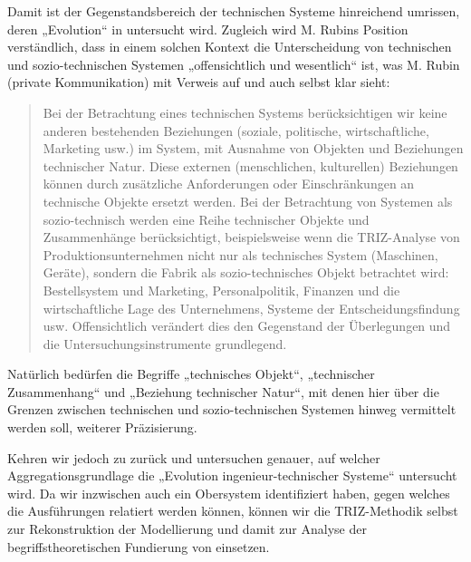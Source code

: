 \documentclass[11pt,a4paper]{article}
\begin{document}
Damit ist der Gegenstandsbereich der technischen Systeme hinreichend umrissen,
deren „Evolution“ in \cite{TESE2018} untersucht wird. Zugleich wird M. Rubins
Position verständlich, dass in einem solchen Kontext die Unterscheidung von
technischen und sozio-technischen Systemen „offensichtlich und wesentlich“
ist, was M. Rubin (private Kommunikation) mit Verweis auf \cite{Rubin2007} und
\cite{Rubin2010} auch selbst klar sieht:
\begin{quote}
  Bei der Betrachtung eines technischen Systems berücksichtigen wir keine
  anderen bestehenden Beziehungen (soziale, politische, wirtschaftliche,
  Marketing usw.) im System, mit Ausnahme von Objekten und Beziehungen
  technischer Natur. Diese externen (menschlichen, kulturellen) Beziehungen
  können durch zusätzliche Anforderungen oder Einschränkungen an technische
  Objekte ersetzt werden.  Bei der Betrachtung von Systemen als
  sozio-technisch werden eine Reihe technischer Objekte und Zusammenhänge
  berücksichtigt, beispielsweise wenn die TRIZ-Analyse von
  Produktionsunternehmen nicht nur als technisches System (Maschinen, Geräte),
  sondern die Fabrik als sozio-technisches Objekt betrachtet wird:
  Bestellsystem und Marketing, Personalpolitik, Finanzen und die
  wirtschaftliche Lage des Unternehmens, Systeme der Entscheidungsfindung usw.
  Offensichtlich verändert dies den Gegenstand der Überlegungen und die
  Untersuchungsinstrumente grundlegend.
\end{quote}
Natürlich bedürfen die Begriffe „technisches Objekt“, „technischer
Zusammenhang“ und „Beziehung technischer Natur“, mit denen hier über die
Grenzen zwischen technischen und sozio-technischen Systemen hinweg vermittelt
werden soll, weiterer Präzisierung.

Kehren wir jedoch zu \cite{TESE2018} zurück und untersuchen genauer, auf
welcher Aggregationsgrundlage die „Evolution ingenieur-technischer Systeme“
untersucht wird.  Da wir inzwischen auch ein Obersystem identifiziert haben,
gegen welches die Ausführungen relatiert werden können, können wir die
TRIZ-Methodik selbst zur Rekonstruktion der Modellierung und damit zur Analyse
der begriffstheoretischen Fundierung von \cite{TESE2018} einsetzen.
\end{document}
